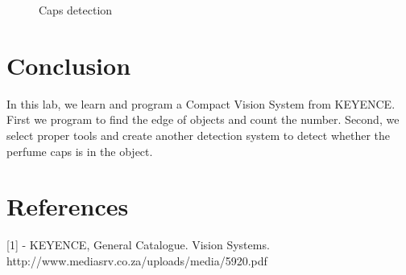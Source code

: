 \documentclass[english]{article}
\begin{document}
\begin{figure}[H]
	\centering
	\caption{Caps detection}
	\label{fig:caps}
\end{figure}

\section{Conclusion}
In this lab, we learn and program a Compact Vision System from KEYENCE. First we program to find the edge of objects and count the number. Second, we select proper tools and  create another detection system to detect whether the perfume caps is in the object.
\section{References}
{[1]} - KEYENCE, General Catalogue. Vision Systems. http://www.mediasrv.co.za/uploads/media/5920.pdf
\end{document}
